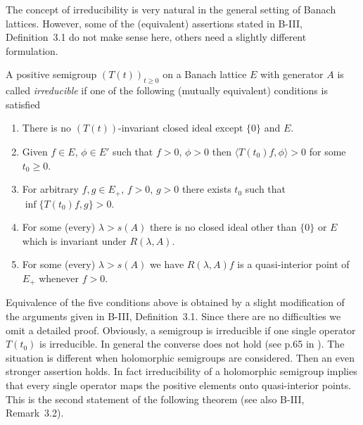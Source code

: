 The concept of irreducibility is very natural in the general setting of Banach lattices.
However, some of the (equivalent) assertions stated in B-III, Definition~3.1 do not make sense here, others need a slightly different formulation.
\begin{definition}\label{def:c3-3.1}
	
	A positive semigroup $(T(t))_{t\geq 0}$ on a Banach lattice $E$ with generator $A$ is called \emph{irreducible} if one of the following (mutually equivalent) conditions is satisfied
	\begin{enumerate}[\upshape (a)]
	\item
	There is no $(T(t))$-invariant closed ideal except $\{0\}$ and $E$.
	
	\item 
	Given $f \in E$, $\phi \in E'$ such that $f > 0$, $\phi > 0$ then $\langle T(t_{0})f,\phi \rangle > 0$ for some $t_{0} \geq 0$.
	
	\item 
	For arbitrary $f,g \in E_{+}$, $f > 0$, $g > 0$ there exists $t_{0}$ such that $\inf\{T(t_{0})f,g\} > 0$.
	
	\item 
	For some (every) $\lambda > s(A)$ there is no closed ideal other than $\{0\}$ or $E$ which is invariant under $R(\lambda,A)$.
	
	\item 
	For some (every) $\lambda > s(A)$ we have $R(\lambda,A)f$ is a quasi-interior point of $E_{+}$ whenever $f > 0$.
	\end{enumerate}
\end{definition}
Equivalence of the five conditions above is obtained by a slight modification of the arguments given in B-III, Definition~3.1.
Since there are no difficulties we omit a detailed proof.
Obviously, a semigroup is irreducible if one single operator $T(t_{0})$ is irreducible.
In general the converse does not hold (see p.65 in \citet{greiner:1982}).
The situation is different when holomorphic semigroups are considered.
Then an even stronger assertion holds. In fact irreducibility of a holomorphic semigroup implies that every single operator maps the positive elements onto quasi-interior points.
This is the second statement of the following theorem (see also B-III, Remark~3.2).

